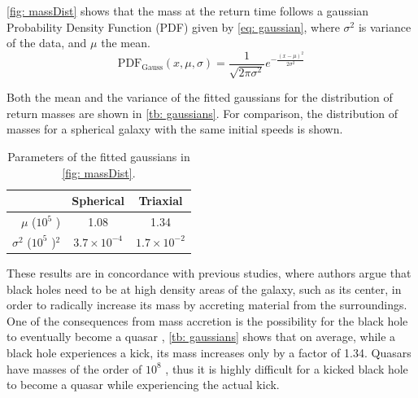 	\autoref{fig: massDist} shows that the mass at the return time follows a gaussian Probability Density Function (PDF) given by \autoref{eq: gaussian}, where $\sigma^2$ is variance of the data, and $\mu$ the mean.
	\begin{equation}\label{eq: gaussian}
		\text{PDF}_\text{Gauss}(x, \mu, \sigma) = \dfrac{1}{\sqrt{2\pi\sigma^2}}e^{-\frac{(x - \mu)^2}{2\sigma^2}}
	\end{equation}
	
	Both the mean and the variance of the fitted gaussians for the distribution of return masses are shown in \autoref{tb: gaussians}. For comparison, the distribution of masses for a spherical galaxy with the same initial speeds is shown.
	\begin{table}[h]
		\centering
		\caption{Parameters of the fitted gaussians in \autoref{fig: massDist}.}
		\begin{tabular}{r|cc}
			\hline
			& \textbf{Spherical} & \textbf{Triaxial} \\
			\hline
			$\mu$ ($10^5$ \sm)& 1.08 & 1.34 \\
			$\sigma^2$ ($10^5$ \sm)$^2$& $3.7\times10^{-4}$ & $1.7\times10^{-2}$\\
			\hline
		\end{tabular}
		\label{tb: gaussians}
	\end{table}

	These results are in concordance with previous studies, where authors argue that black holes need to be at high density areas of the galaxy, such as its center, in order to radically increase its mass by accreting material from the surroundings. One of the consequences from mass accretion is the possibility for the black hole to eventually become a quasar \cite{tanaka2009assembly}, \autoref{tb: gaussians} shows that on average, while a black hole experiences a kick, its mass increases only by a factor of 1.34. Quasars have masses of the order of $10^8$ \sm, thus it is highly difficult for a kicked black hole to become a quasar while experiencing the actual kick.
	
